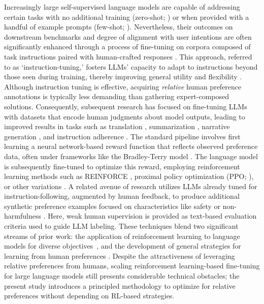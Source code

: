 Increasingly large self-supervised language models are capable of addressing certain tasks with no additional training (zero-shot; \citep{radford2019language}) or when provided with a handful of example prompts (few-shot; \citep{gpt3,megatron,chowdhery2022palm}). Nevertheless, their outcomes on downstream benchmarks and degree of alignment with user intentions are often significantly enhanced through a process of fine-tuning on corpora composed of task instructions paired with human-crafted responses \citep{mishra-etal-2022-cross,sanh2022multitask,chung2022scaling,thoppilan2022lamda}. This approach, referred to as `instruction-tuning,' fosters LLMs’ capacity to adapt to instructions beyond those seen during training, thereby improving general utility and flexibility \citep{chung2022scaling}. Although instruction tuning is effective, acquiring \textit{relative} human preference annotations is typically less demanding than gathering expert-composed solutions. Consequently, subsequent research has focused on fine-tuning LLMs with datasets that encode human judgments about model outputs, leading to improved results in tasks such as translation \citep{kreutzer-etal-2018-reliability}, summarization \citep{stiennon2022learning,ziegler2020finetuning}, narrative generation \citep{ziegler2020finetuning}, and instruction adherence \citep{ouyang2022training,ramamurthy2023is}. The standard pipeline involves first learning a neural network-based reward function that reflects observed preference data, often under frameworks like the Bradley-Terry model \citep{bradley1952rankanalysis}. The language model is subsequently fine-tuned to optimize this reward, employing reinforcement learning methods such as REINFORCE \citep{williams1992reinforce}, proximal policy optimization (PPO; \cite{schulman2017proximal}), or other variations \citep{ramamurthy2023is}. A related avenue of research utilizes LLMs already tuned for instruction-following, augmented by human feedback, to produce additional synthetic preference examples focused on characteristics like safety or non-harmfulness \citep{bai2022constitutional}. Here, weak human supervision is provided as text-based evaluation criteria used to guide LLM labeling. These techniques blend two significant streams of prior work: the application of reinforcement learning to language models for diverse objectives~\citep{Ranzato2015SequenceLT,paulus2018a,wu2018learning}, and the development of general strategies for learning from human preferences \citep{christiano2017deep,kupcsik2018learning}. Despite the attractiveness of leveraging relative preferences from humans, scaling reinforcement learning-based fine-tuning for large language models still presents considerable technical obstacles; the present study introduces a principled methodology to optimize for relative preferences without depending on RL-based strategies.

